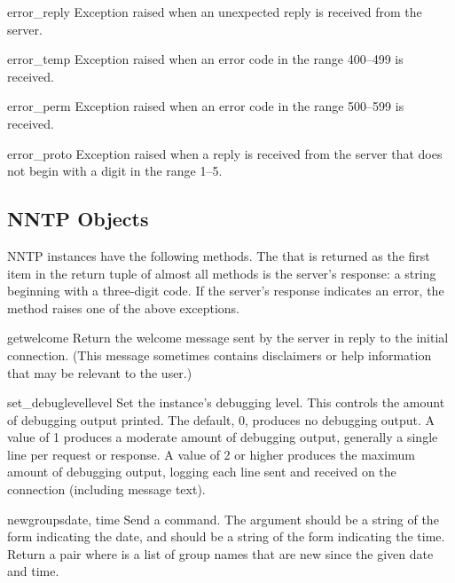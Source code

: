 \begin{excdesc}{error_reply}
Exception raised when an unexpected reply is received from the server.
\end{excdesc}

\begin{excdesc}{error_temp}
Exception raised when an error code in the range 400--499 is received.
\end{excdesc}

\begin{excdesc}{error_perm}
Exception raised when an error code in the range 500--599 is received.
\end{excdesc}

\begin{excdesc}{error_proto}
Exception raised when a reply is received from the server that does
not begin with a digit in the range 1--5.
\end{excdesc}

\subsection{NNTP Objects}

NNTP instances have the following methods.  The  that is
returned as the first item in the return tuple of almost all methods
is the server's response: a string beginning with a three-digit code.
If the server's response indicates an error, the method raises one of
the above exceptions.


\begin{funcdesc}{getwelcome}{}
Return the welcome message sent by the server in reply to the initial
connection.  (This message sometimes contains disclaimers or help
information that may be relevant to the user.)
\end{funcdesc}

\begin{funcdesc}{set_debuglevel}{level}
Set the instance's debugging level.  This controls the amount of
debugging output printed.  The default, 0, produces no debugging
output.  A value of 1 produces a moderate amount of debugging output,
generally a single line per request or response.  A value of 2 or
higher produces the maximum amount of debugging output, logging each
line sent and received on the connection (including message text).
\end{funcdesc}

\begin{funcdesc}{newgroups}{date, time}
Send a  command.  The  argument should be a
string of the form  indicating the
date, and  should be a string of the form
 indicating the time.  Return a pair
 where  is a list of
group names that are new since the given date and time.
\end{funcdesc}

